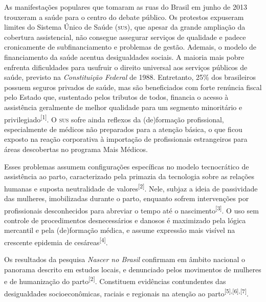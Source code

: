 \documentclass{article}
\begin{document}
As manifestações populares que tomaram as ruas do Brasil em junho de 2013
trouxeram a
saúde para o centro do debate público. Os protestos expuseram limites do Sistema
Único
de Saúde (\textsc{sus}), que apesar da grande ampliação da cobertura assistencial, não
consegue
assegurar serviços de qualidade e padece cronicamente de subfinanciamento e
problemas de
gestão. Ademais, o modelo de financiamento da saúde acentua desigualdades
sociais. A
maioria mais pobre enfrenta dificuldades para usufruir o direito universal aos
serviços
públicos de saúde, previsto na \textit{Constituição Federal}
de 1988.
Entretanto, 25\% dos brasileiros possuem seguros privados de saúde, mas são
beneficiados
com forte renúncia fiscal pelo Estado que, sustentado pelos tributos de todos,
financia
o acesso à assistência geralmente de melhor qualidade para um segmento
minoritário e
privilegiado\textsuperscript{[}\textsuperscript{1}\textsuperscript{]}. O \textsc{sus} sofre ainda
reflexos da (de)formação profissional, especialmente de médicos não preparados
para a
atenção básica, o que ficou exposto na reação corporativa à importação de
profissionais
estrangeiros para áreas descobertas no programa Mais Médicos.

Esses problemas assumem configurações específicas no modelo tecnocrático de
assistência
ao parto, caracterizado pela primazia da tecnologia sobre as relações humanas e
suposta
neutralidade de valores\textsuperscript{[}\textsuperscript{2}\textsuperscript{]}. Nele, subjaz
a ideia de passividade das mulheres, imobilizadas durante o parto, enquanto
sofrem
intervenções por profissionais desconhecidos para abreviar o tempo até o
nascimento\textsuperscript{[}\textsuperscript{3}\textsuperscript{]}. O uso sem controle de
procedimentos desnecessários e danosos é maximizado pela lógica mercantil e pela
(de)formação médica, e assume expressão mais visível na crescente epidemia de
cesáreas\textsuperscript{[}\textsuperscript{4}\textsuperscript{]}.

Os resultados da pesquisa \textit{Nascer no Brasil}
confirmam em âmbito nacional
o panorama descrito em estudos locais, e denunciado pelos movimentos de mulheres
e de
humanização do parto\textsuperscript{[}\textsuperscript{2}\textsuperscript{]}. Constituem
evidências contundentes das desigualdades socioeconômicas, raciais e regionais
na
atenção ao parto\textsuperscript{[}\textsuperscript{5}\textsuperscript{]}\textsuperscript{,}\textsuperscript{[}\textsuperscript{6}\textsuperscript{]}\textsuperscript{,}\textsuperscript{[}\textsuperscript{7}\textsuperscript{]}.
\end{document}
